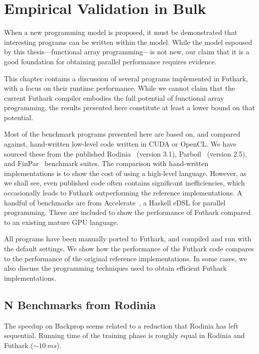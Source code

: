 \chapter{Empirical Validation in Bulk}
\label{chap:empirical-validation}

When a new programming model is proposed, it must be demonstrated that
interesting programs can be written within the model.  While the model
espoused by this thesis---functional array programming---is not new,
our claim that it is a good foundation for obtaining parallel
performance requires evidence.

This chapter contains a discussion of several programs implemented in
Futhark, with a focus on their runtime performance.  While we cannot
claim that the current Futhark compiler embodies the full potential of
functional array programming, the results presented here constitute at
least a lower bound on that potential.

Most of the benchmark programs presented here are based on, and
compared against, hand-written low-level code written in CUDA or
OpenCL.  We have sourced these from the published
Rodinia~\cite{5306797} (version 3.1),
Parboil~\cite{stratton2012parboil} (version 2.5), and
FinPar~\cite{FinPar:TACO} benchmark suites.  The comparison with
hand-written implementations is to show the cost of using a high-level
language.  However, as we shall see, even published code often
contains significant inefficiencies, which occasionally leads to
Futhark outperforming the reference implementations.  A handful of
benchmarks are from Accelerate~\cite{mcdonell2013optimising}, a
Haskell eDSL for parallel programming.  These are included to show the
performance of Futhark compared to an existing mature GPU language.

All programs have been manually ported to Futhark, and compiled and
run with the default settings.  We show how the performance of the
Futhark code compares to the performance of the original reference
implementations.  In some cases, we also discuss the programming
techniques used to obtain efficient Futhark implementations.

\section{N Benchmarks from Rodinia}

The speedup on Backprop seems related to a reduction that Rodinia has
left sequential.  Running time of the training phase is roughly equal
in Rodinia and Futhark ($\sim10~ms$).

